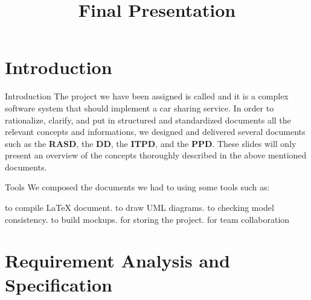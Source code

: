 \documentclass{../Common/Structure/pdf_presentation}
\title{Final Presentation}
\begin{document}
	\titleToc{}
	\section{Introduction}
	\begin{frame}{Introduction}
		The project we have been assigned is called \PowerEnJoy{} and it is a complex software system that should implement a
		car sharing service. In order to rationalize, clarify, and put in structured and standardized documents all the
		relevant concepts and informations, we designed and delivered several documents such as the \textbf{RASD}, the  \textbf{DD},
		the \textbf{ITPD}, and the \textbf{PPD}. These slides will only present an overview of the concepts thoroughly
		described in the above mentioned documents.
	\end{frame}
	\begin{frame}{Tools}
		We composed the documents we had to using some tools such as:
		\begin{itemize}
			 to compile \LaTeX{} document.
			 to draw UML diagrams.
			 to checking model consistency.
			 to build mockups.
			 for storing the project.
			 for team collaboration
		\end{itemize}
	\end{frame}
	\section{Requirement Analysis and Specification}
\end{document}
